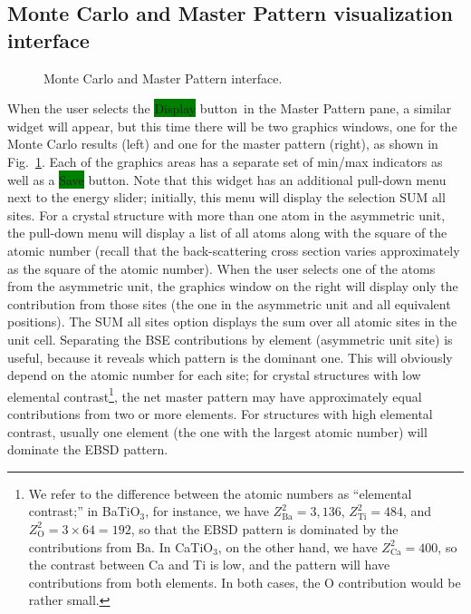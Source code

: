 \documentclass[DIV=calc, paper=letter, fontsize=11pt]{scrartcl}	 %
\newcommand{\button}[1]{\colorbox{green}{\textsf{#1}} button}
\begin{document}
\subsection{Monte Carlo and Master Pattern visualization interface\label{sec:idlMCMP}}

\begin{figure}[t]
\leavevmode\centering
\epsfxsize=6in
\caption{\label{fig:MCMPdisplay}Monte Carlo and Master Pattern interface.}
\end{figure}

When the user selects the \button{Display}\ in the Master Pattern pane, a similar widget will appear, but this time there 
will be two graphics windows, one for the Monte Carlo results (left) and one for the master pattern (right), as shown in 
Fig.~\ref{fig:MCMPdisplay}.  Each of the graphics areas has a separate set of min/max indicators as well as a \button{Save}.
Note that this widget has an additional pull-down menu next to the energy slider; initially, this menu will display the selection
\textsf{SUM all sites}.  For a crystal structure with more than one atom in the asymmetric unit, the pull-down menu will
display a list of all atoms along with the square of the atomic number (recall that the back-scattering cross section varies
approximately as the square of the atomic number).  When the user selects one of the atoms from the asymmetric unit, 
the graphics window on the right will display only the contribution from those sites (the one in the asymmetric unit
and all equivalent positions).  The \textsf{SUM all sites} option displays the sum over all atomic sites in the unit cell.
Separating the BSE contributions by element (asymmetric unit site) is useful, because it reveals which pattern is the dominant one.  
This will obviously depend on the atomic number for each site; for crystal structures with low elemental contrast\footnote{We refer
to the difference between the atomic numbers as ``elemental contrast;''  in BaTiO$_3$, for instance, we have $Z^2_{\text{Ba}}=3,136$,
$Z^2_{\text{Ti}}=484$, and $Z^2_{\text{O}}=3\times 64=192$, so that the EBSD pattern is dominated by the contributions from Ba.  In CaTiO$_3$, on the
other hand, we have $Z^2_{\text{Ca}}=400$, so the contrast between Ca and Ti is low, and the pattern will have contributions from
both elements.  In both cases, the O contribution would be rather small.}, the net master pattern may have approximately equal contributions 
from two or more elements.  For structures with high elemental contrast, usually one element (the one with the largest atomic number) will
dominate the EBSD pattern.
\end{document}
